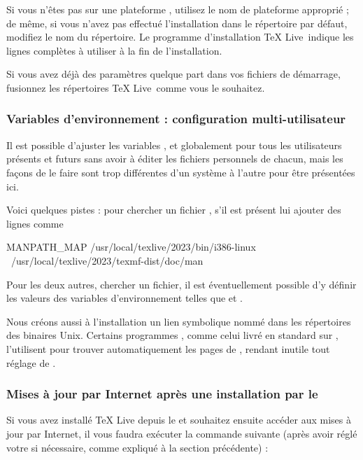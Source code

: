 \documentclass[german, english, french]{article}
\renewcommand{\TL}{\TeX{} Live\xspace}%
\begin{document}
Si vous n'êtes pas sur une plateforme , utilisez le nom de
plateforme approprié ; de même, si vous n'avez pas effectué l'installation dans
le répertoire par défaut, modifiez le nom du répertoire. Le programme
d'installation \TL\ indique les lignes complètes à utiliser à la fin de
l'installation.

Si vous avez déjà des paramètres  quelque part dans vos fichiers
de démarrage, fusionnez les répertoires \TL\ comme vous le souhaitez.

\subsubsection{Variables d'environnement : configuration multi-utilisateur}
\label{sec:envglobal}

Il est possible d'ajuster les variables ,  et
 globalement pour tous les utilisateurs présents et futurs
sans avoir à éditer les fichiers personnels de chacun, mais les façons de le
faire sont trop différentes d'un système à l'autre pour être présentées ici.

Voici quelques pistes : pour  chercher un fichier
, s'il est présent lui ajouter des lignes comme
\begin{sverbatim}
MANPATH_MAP /usr/local/texlive/2023/bin/i386-linux \
            /usr/local/texlive/2023/texmf-dist/doc/man
\end{sverbatim}
Pour les deux autres, chercher un fichier, il est
éventuellement possible d'y définir les valeurs des variables d'environnement
telles que \envname{PATH} et \envname{INFOPATH}.

Nous créons aussi à l'installation un lien symbolique nommé  dans les
répertoires des binaires Unix. Certains programmes , comme celui livré
en standard sur \macOS{}, l'utilisent pour trouver automatiquement les pages de
\code{man}, rendant inutile tout réglage de \envname{MANPATH}.

\subsubsection{Mises à jour par Internet après une installation par le
  \protect\DVD}
\label{sec:dvd-install-net-updates}

Si vous avez installé \TL{} depuis le \DVD{} et souhaitez ensuite accéder aux
mises à jour par Internet, il vous faudra exécuter la commande suivante (après
avoir réglé votre \envname{PATH} si nécessaire, comme expliqué à la section
précédente) :
\end{document}
